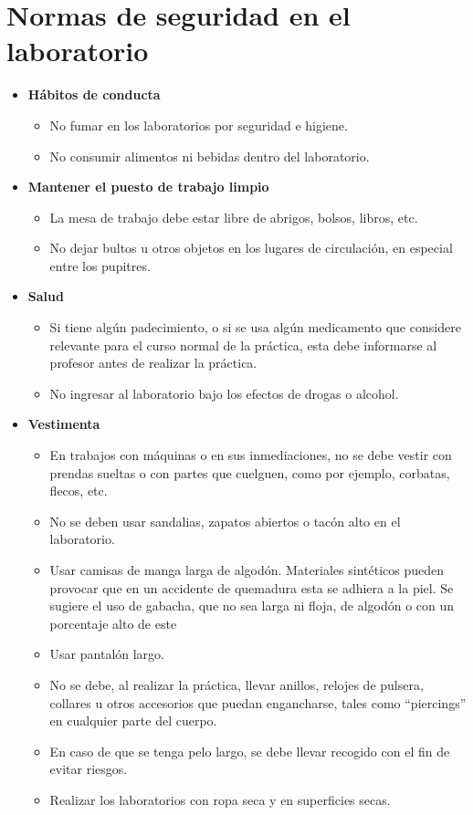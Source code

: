 \documentclass[12pt,letterpaper]{report}
\begin{document}
\chapter{Normas de seguridad en el laboratorio}

\begin{itemize}
\item \textbf{Hábitos de conducta}
\begin{itemize}
\item No fumar en los laboratorios por seguridad e higiene.
\item No consumir alimentos ni bebidas dentro del laboratorio.
\end{itemize}

\item \textbf{Mantener el puesto de trabajo limpio}
\begin{itemize}
\item La mesa de trabajo debe estar libre de abrigos, bolsos, libros, etc.
\item No dejar bultos u otros objetos en los lugares de circulación, en especial
entre los pupitres.
\end{itemize}

\item \textbf{Salud}
\begin{itemize}
\item Si tiene algún padecimiento, o si se usa algún medicamento que
considere relevante para el curso normal de la práctica, esta debe
informarse al profesor antes de realizar la práctica.
\item No ingresar al laboratorio bajo los efectos de drogas o alcohol.
\end{itemize}

\item \textbf{Vestimenta}
\begin{itemize}
\item En trabajos con máquinas o en sus inmediaciones, no se debe vestir
con prendas sueltas o con partes que cuelguen, como por ejemplo,
corbatas, flecos, etc.
\item No se deben usar sandalias, zapatos abiertos o tacón alto en el
laboratorio.
\item Usar camisas de manga larga de algodón. Materiales sintéticos pueden
provocar que en un accidente de quemadura esta se adhiera a la piel.
Se sugiere el uso de gabacha, que no sea larga ni floja, de algodón o
con un porcentaje alto de este
\item Usar pantalón largo.
\item No se debe, al realizar la práctica, llevar anillos, relojes de pulsera,
collares u otros accesorios que puedan engancharse, tales como
“piercings” en cualquier parte del cuerpo.
\item En caso de que se tenga pelo largo, se debe llevar recogido con el fin de
evitar riesgos.
\item Realizar los laboratorios con ropa seca y en superficies secas.
\end{itemize}


\end{itemize}
\end{document}
